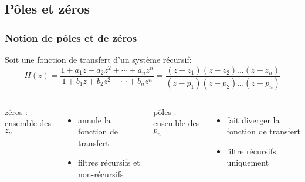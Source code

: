 \documentclass{beamer}
\begin{document}
\subsection{Pôles et zéros}
\begin{frame}
\frametitle{Notion de pôles et de zéros}
Soit une fonction de transfert d'un système récursif: \\
\[ H(z) = \frac{1+ a_1 z + a_2 z^2 + \cdots + a_n z^n }{1+ b_1 z + b_2 z^2 + \cdots + b_n z^n} = \frac{(z-z_1)(z-z_2)...(z-z_n)}{(z-p_1)(z-p_2)...(z-p_n)} \] 

\vspace{0.3cm}

\begin{columns}[T]
\column{60mm}
zéros : ensemble des $z_n$ \\
\begin{itemize}
\item<3-> annule la fonction de transfert
\item<4-> filtres récursifs et non-récursifs 
\end{itemize}
\column{60mm}
pôles : ensemble des $p_n$ \\
\begin{itemize}
\item<3-> fait diverger la fonction de transfert
\item<4-> filtre récursifs uniquement
\end{itemize}

\end{columns} 

\end{frame}
\end{document}
